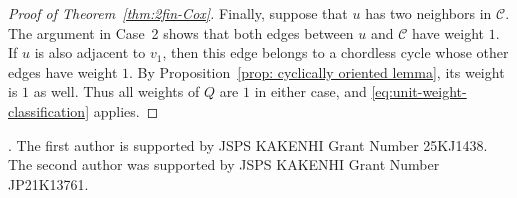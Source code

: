 \documentclass[11pt,reqno]{amsart}
\numberwithin{equation}{section}
\theoremstyle{definition}
\theoremstyle{plain}
\begin{document}
\begin{proof}[Proof of Theorem~\ref{thm:2fin-Cox}]
		Finally, suppose that $u$ has two neighbors in $\mathcal C$. The argument in Case~2 shows that both edges between $u$ and $\mathcal C$ have weight $1$. If $u$ is also adjacent to $v_1$, then this edge belongs to a chordless cycle whose other edges have weight $1$. By Proposition~\ref{prop: cyclically oriented lemma}, its weight is $1$ as well. Thus all weights of $Q$ are $1$ in either case, and \eqref{eq:unit-weight-classification} applies.
	\end{proof}

\medskip{}.
The first author is supported by JSPS KAKENHI Grant Number 25KJ1438.
The second author was supported by JSPS KAKENHI Grant Number JP21K13761.



\end{document}
